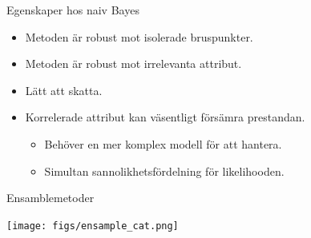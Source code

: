\documentclass[10pt,english]{beamer}
\begin{document}
\begin{frame}{Egenskaper hos naiv Bayes}
    \begin{itemize}
        \item Metoden är robust mot isolerade bruspunkter.
        \item Metoden är robust mot irrelevanta attribut.
        \item Lätt att skatta.
        \item Korrelerade attribut kan väsentligt försämra prestandan.
        \begin{itemize}
            \item Behöver en mer komplex modell för att hantera.
            \item Simultan sannolikhetsfördelning för likelihooden.
        \end{itemize}
    \end{itemize}
\end{frame}

\begin{frame}{Ensamblemetoder}
    
    \texttt{[image: figs/ensample\_cat.png]}

\end{frame}
\end{document}
